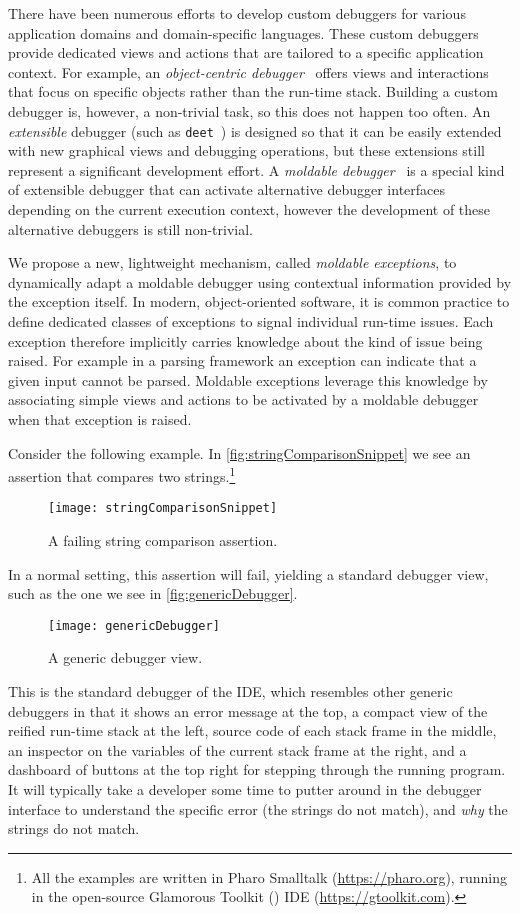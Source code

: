 \documentclass[sigplan,anonymous,review,10pt]{acmart}
\newcommand{\GT}{\lst{GT}\xspace} %
\newcommand\deet{{\tt deet}\xspace}
\begin{document}
There have been numerous efforts to develop custom debuggers for various application domains and domain-specific languages.
These custom debuggers provide dedicated views and actions that are tailored to a specific application context.
For example, an \emph{object-centric debugger}~\cite{Ress12a} offers views and interactions that focus on specific objects rather than the run-time stack.
Building a custom debugger is, however, a non-trivial task, so this does not happen too often.
An \emph{extensible} debugger (such as \deet~\cite{Hans97a}) is designed so that it can be easily extended with new graphical views and debugging operations, but these extensions still represent a significant development effort.
A \emph{moldable debugger}~\cite{Chis15c} is a special kind of extensible debugger that can activate alternative debugger interfaces depending on the current execution context, however the development of these alternative debuggers is still non-trivial.

We propose a new, lightweight mechanism, called \emph{moldable exceptions}, to dynamically adapt a moldable debugger using contextual information provided by the exception itself.
In modern, object-oriented software, it is common practice to define dedicated classes of exceptions to signal individual run-time issues.
Each exception therefore implicitly carries knowledge about the kind of issue being raised.
For example in a parsing framework an exception can indicate that a given input cannot be parsed.
Moldable exceptions leverage this knowledge by associating simple views and actions to be activated by a moldable debugger when that exception is raised.

Consider the following example.
In \autoref{fig:stringComparisonSnippet} we see an assertion that compares two strings.\footnote{All the examples are written in Pharo Smalltalk (\url{https://pharo.org}), running in the open-source Glamorous Toolkit (\GT) IDE (\url{https://gtoolkit.com}).}
\begin{figure}[h]
  \texttt{[image: stringComparisonSnippet]}
  \caption{A failing string comparison assertion.}
  \label{fig:stringComparisonSnippet}
\end{figure}
In a normal setting, this assertion will fail, yielding a standard debugger view, such as the one we see in \autoref{fig:genericDebugger}.
\begin{figure}[h]
  \texttt{[image: genericDebugger]}
  \caption{A generic debugger view.}
  \label{fig:genericDebugger}
\end{figure}
This is the standard debugger of the \GT IDE, which resembles other generic debuggers in that it shows an error message at the top, a compact view of the reified run-time stack at the left, source code of each stack frame in the middle, an inspector on the variables of the current stack frame at the right, and a dashboard of buttons at the top right for stepping through the running program.
It will typically take a developer some time to putter around in the debugger interface to understand the specific error (the strings do not match), and \emph{why} the strings do not match.
\end{document}
